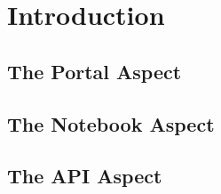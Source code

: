 \section{Introduction}\label{introduction}

\subsection{The Portal Aspect}\label{portal-aspect-intro}

\subsection{The Notebook Aspect}\label{notebook-aspect-intro}

\subsection{The API Aspect}\label{api-aspect-intro}


